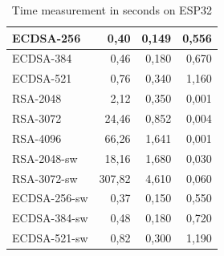 \documentclass[thesis=M,english]{FITthesis}[2019/12/23]
\begin{document}
\begin{table}[]
\begin{tabular}{|l|r|r|r|}
 ECDSA-256           &  0,40                             &  0,149                        &  0,556                             \\ \hline
 ECDSA-384           &  0,46                            &  0,180                         &  0,670                              \\ \hline
 ECDSA-521           &  0,76                            &  0,340                        &  1,160                              \\ \hline
 RSA-2048            &  2,12                            &  0,350                         &  0,001                             \\ \hline
 RSA-3072            &  24,46                           &  0,852                        &  0,004                             \\ \hline
 RSA-4096            &  66,26                           &  1,641                        &  0,001                             \\ \hline
 RSA-2048-sw  & 18,16  & 1,680 & 0,030 \\ \hline
RSA-3072-sw  & 307,82 & 4,610 & 0,060 \\ \hline
ECDSA-256-sw & 0,37   & 0,150 & 0,550 \\ \hline
ECDSA-384-sw & 0,48   & 0,180 & 0,720 \\ \hline
ECDSA-521-sw & 0,82   & 0,300  & 1,190 \\ \hline
\end{tabular}
\caption{Time measurement in seconds on ESP32}
\end{table}
\end{document}
